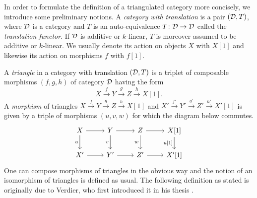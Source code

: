 In order to formulate the definition of a triangulated category more concisely, we introduce some preliminary notions. A \emph{category with translation} is a pair $(\mathcal D, T)$, where $\mathcal D$ is a category and $T$ is an auto-equivalence $T\colon \mathcal D \to \mathcal D$ called the \emph{translation functor}. If $\mathcal D$ is additive or $k$-linear, $T$ is moreover assumed to be additive or $k$-linear. We usually denote its action on objects $X$ with $X[1]$ and likewise its action on morphisms $f$ with $f[1]$.

A \emph{triangle} in a category with translation $(\mathcal D, T)$ is a triplet of composable morphisms $(f, g, h)$ of category $\mathcal D$ having the form 
\[
    X\xrightarrow{\ f \ } Y \xrightarrow{\ g \ } Z \xrightarrow{\ h \ } X[1].
\]
A \emph{morphism} of triangles $X\xrightarrow{f} Y \xrightarrow{g} Z \xrightarrow{h} X[1]$ and $X'\xrightarrow{f'} Y' \xrightarrow{g'} Z' \xrightarrow{h'} X'[1]$ is given by a triple of morphisms $(u, v, w)$ for which the diagram below commutes.
\[
\begin{tikzcd}
	X & Y & Z & {X[1]} \\
	{X'} & {Y'} & {Z'} & {X'[1]}
	\arrow[from=1-1, to=1-2]
	\arrow["u"', from=1-1, to=2-1]
	\arrow[from=1-2, to=1-3]
	\arrow["v"', from=1-2, to=2-2]
	\arrow[from=1-3, to=1-4]
	\arrow["w"', from=1-3, to=2-3]
	\arrow["{u[1]}"', from=1-4, to=2-4]
	\arrow[from=2-1, to=2-2]
	\arrow[from=2-2, to=2-3]
	\arrow[from=2-3, to=2-4]
\end{tikzcd}
\]
One can compose morphisms of triangles in the obvious way and the notion of an isomorphism of triangles is defined as usual. The following definition as stated is originally due to Verdier, who first introduced it in his thesis \cite{Verdier}.

